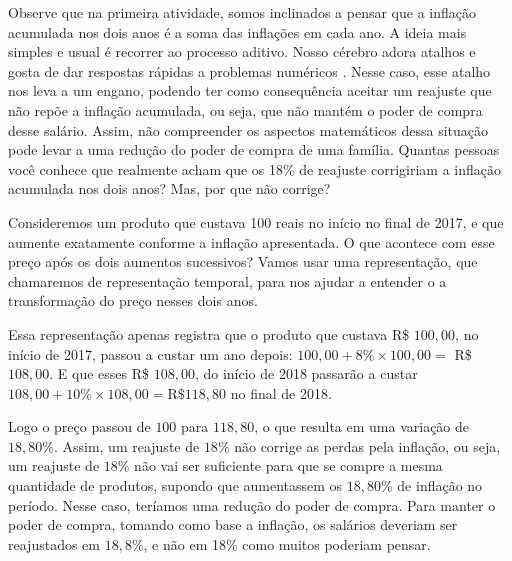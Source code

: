 \label{fin-arg-1}

Observe que na primeira atividade, somos inclinados a pensar que a inflação acumulada nos dois anos é a soma das inflações em cada ano. A ideia mais simples e usual é recorrer ao processo aditivo. Nosso cérebro adora atalhos e gosta de dar respostas rápidas a problemas numéricos \citep{kahneman2012}. Nesse caso, esse atalho nos leva a um engano, podendo ter como consequência aceitar um reajuste que não repõe a inflação acumulada, ou seja, que não mantém o poder de compra desse salário. Assim, não compreender os aspectos matemáticos dessa situação pode levar a uma redução do poder de compra de uma família. Quantas pessoas você conhece que realmente acham que os 18\% de reajuste corrigiriam a inflação acumulada nos dois anos? Mas, por que não corrige?

Consideremos um produto que custava 100 reais no início no final de 2017, e que aumente exatamente conforme a inflação apresentada. O que acontece com esse preço após os dois aumentos sucessivos? Vamos usar uma representação, que chamaremos de representação temporal, para nos ajudar a entender o a transformação do preço nesses dois anos.  

\begin{figure}[H]
\centering


\end{figure}

Essa representação apenas registra que o produto que custava R\$ $100{,}00$, no início de 2017, passou a custar um ano depois: $100{,}00 + 8\%\times100{,}00 =$ R\$ $108{,}00$. E que esses R\$ $108{,}00$, do início de 2018 passarão a custar $108{,}00 + 10\% \times 108{,}00 = \text{R\$ } 118{,}80$ no final de 2018. 

Logo o preço passou de $100$ para $118{,}80$, o que resulta em uma variação de $18{,}80\%$. Assim, um reajuste de $18\%$ não corrige as perdas pela inflação, ou seja, um reajuste de $18\%$ não vai ser suficiente para que se compre a mesma quantidade de produtos, supondo que aumentassem os $18{,}80$\% de inflação no período. Nesse caso, teríamos uma redução do poder de compra. Para manter o poder de compra, tomando como base a inflação, os salários deveriam ser reajustados em $18{,}8\%$, e não em 18\% como muitos poderiam pensar. 

